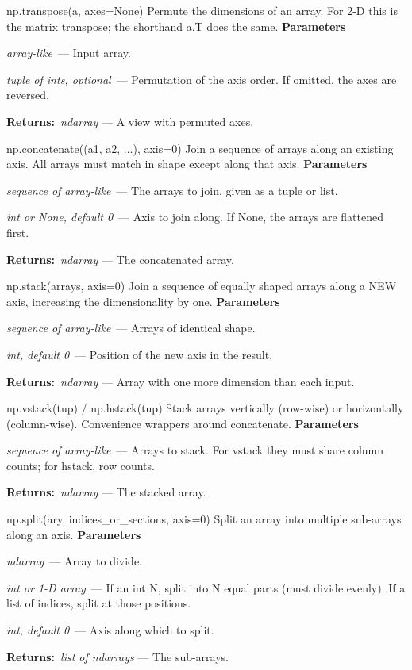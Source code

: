 \documentclass[10pt]{article}
\newenvironment{params}
  {\smallskip\textbf{\small\color{accent}Parameters}\par\nopagebreak
   \begin{description}[leftmargin=1.3em,itemsep=1.5pt,parsep=0pt,topsep=1pt,
      labelindent=0pt,style=sameline,font=\normalfont]}
  {\end{description}}
\newcommand{\pitem}[3]{\item[{\ttfamily\color{accent}#1}]{\itshape #2}\ --- #3}
\newcommand{\preturn}[2]{\smallskip\textbf{\small\color{accent}Returns:}\ {\itshape #1} --- #2\par}
\begin{document}
\begin{func}{np.transpose(a, axes=None)}
Permute the dimensions of an array. For 2-D this is the matrix transpose; the shorthand a.T does the same.
\begin{params}
\pitem{a}{array-like}{Input array.}
\pitem{axes}{tuple of ints, optional}{Permutation of the axis order. If omitted, the axes are reversed.}
\end{params}
\preturn{ndarray}{A view with permuted axes.}
\end{func}
\medskip

\begin{func}{np.concatenate((a1, a2, ...), axis=0)}
Join a sequence of arrays along an existing axis. All arrays must match in shape except along that axis.
\begin{params}
\pitem{(a1, a2, ...)}{sequence of array-like}{The arrays to join, given as a tuple or list.}
\pitem{axis}{int or None, default 0}{Axis to join along. If None, the arrays are flattened first.}
\end{params}
\preturn{ndarray}{The concatenated array.}
\end{func}
\medskip

\begin{func}{np.stack(arrays, axis=0)}
Join a sequence of equally shaped arrays along a NEW axis, increasing the dimensionality by one.
\begin{params}
\pitem{arrays}{sequence of array-like}{Arrays of identical shape.}
\pitem{axis}{int, default 0}{Position of the new axis in the result.}
\end{params}
\preturn{ndarray}{Array with one more dimension than each input.}
\end{func}
\medskip

\begin{func}{np.vstack(tup)  /  np.hstack(tup)}
Stack arrays vertically (row-wise) or horizontally (column-wise). Convenience wrappers around concatenate.
\begin{params}
\pitem{tup}{sequence of array-like}{Arrays to stack. For vstack they must share column counts; for hstack, row counts.}
\end{params}
\preturn{ndarray}{The stacked array.}
\end{func}
\medskip

\begin{func}{np.split(ary, indices\_or\_sections, axis=0)}
Split an array into multiple sub-arrays along an axis.
\begin{params}
\pitem{ary}{ndarray}{Array to divide.}
\pitem{indices\_or\_sections}{int or 1-D array}{If an int N, split into N equal parts (must divide evenly). If a list of indices, split at those positions.}
\pitem{axis}{int, default 0}{Axis along which to split.}
\end{params}
\preturn{list of ndarrays}{The sub-arrays.}
\end{func}
\medskip
\end{document}
